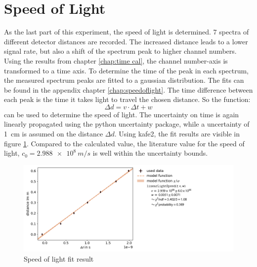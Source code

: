 \section{Speed of Light}
As the last part of this experiment, the speed of light is determined. 7 spectra of different detector distances are recorded. The increased distance leads to a lower signal rate, but also a shift of the spectrum peak to higher channel numbers. Using the results from chapter \ref{chap:time cal}, the channel number-axis is transformed to a time axis. To determine the time of the peak in each spectrum, the measured spectrum peaks are fitted to a gaussian distribution. The fits can be found in the appendix chapter \ref{chap:speedoflight}.
The time difference between each peak is the time it takes light to travel the chosen distance. So the function: 
$$\Delta d = v\cdot \Delta t + w$$
can be used to determine the speed of light. The uncertainty on time is again linearly propagated using the python uncertainty package, while a uncertainty of \SI{1}{cm} is assumed on the distance $\Delta d$. Using kafe2, the fit results are visible in figure \ref{fig:lightspeedfit}. Compared to the calculated value, the literature value for the speed of light, $c_0 = \SI{2.988e8}{m/s}$ is well within the uncertainty bounds. 
\begin{figure}[]
    \centering
    \includegraphics[width=200mm,scale=0.5]{Positronium/include/lightspeedfit.png}
    \caption{Speed of light fit result} 
    \label{fig:lightspeedfit}
\end{figure}
